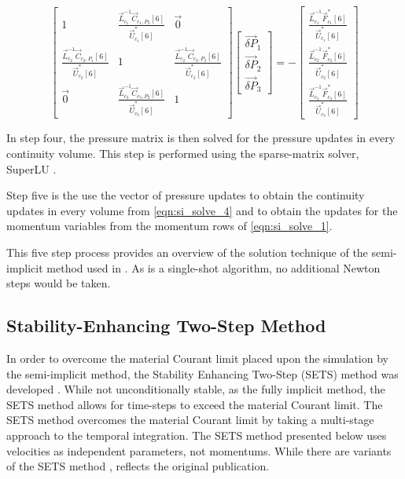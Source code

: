   \begin{equation}
 \label{eqn:si_pressure_matrix}
 \begin{bmatrix} 
 1 & \frac{\vec{L}^{-1}_{c_1}\vec{C}_{c_1,P_2}[6]}{\vec{U}^{*}_{c_1}[6]} & \vec{0} \\
 \frac{\vec{L}^{-1}_{c_2}\vec{C}_{c_2,P_1}[6]}{\vec{U}^{*}_{c_2}[6]} & 1 & \frac{\vec{L}^{-1}_{c_2}\vec{C}_{c_2,P_3}[6]}{\vec{U}^{*}_{c_2}[6]} \\
 \vec{0}           & \frac{\vec{L}^{-1}_{c_3}\vec{C}_{c_3,P_2}[6]}{\vec{U}^{*}_{c_3}[6]} & 1
 \end{bmatrix} \begin{bmatrix}
 \vec{\delta P}_{1} \\
 \vec{\delta P}_{2} \\
 \vec{\delta P}_{3}
\end{bmatrix}  = -\begin{bmatrix}
 \frac{\vec{L}^{-1}_{c_1}\vec{F}^{*}_{c_1}[6]}{\vec{U}^{*}_{c_1}[6]} \\
 \frac{\vec{L}^{-1}_{c_2}\vec{F}^{*}_{c_2}[6]}{\vec{U}^{*}_{c_2}[6]} \\
 \frac{\vec{L}^{-1}_{c_3}\vec{F}^{*}_{c_3}[6]}{\vec{U}^{*}_{c_3}[6]}
\end{bmatrix}
 \end{equation}

In step four, the pressure matrix is then solved for the pressure updates in every continuity volume.
This step is performed using the sparse-matrix solver, SuperLU \cite{Li1999}. 

Step five is the use the vector of pressure updates to obtain the continuity updates in every volume from \eqref{eqn:si_solve_4} and to obtain the updates for the momentum variables from the momentum rows of \eqref{eqn:si_solve_1}.

This five step process provides an overview of the solution technique of the semi-implicit method used in \cobra.
As \cobra is a single-shot algorithm, no additional Newton steps would be taken.

\subsection{Stability-Enhancing Two-Step Method} 
\label{subsect:numerics_sets}
In order to overcome the material Courant limit placed upon the simulation by the semi-implicit method, the Stability Enhancing Two-Step (SETS) method was developed \cite{Mahaffy1982}.
While not unconditionally stable, as the fully implicit method, the SETS method allows for time-steps to exceed the material Courant limit.
The SETS method overcomes the material Courant limit by taking a multi-stage approach to the temporal integration.
The SETS method presented below uses velocities as independent parameters, not momentums.
While there are variants of the SETS method \cite{TRACE},  reflects the original publication.

